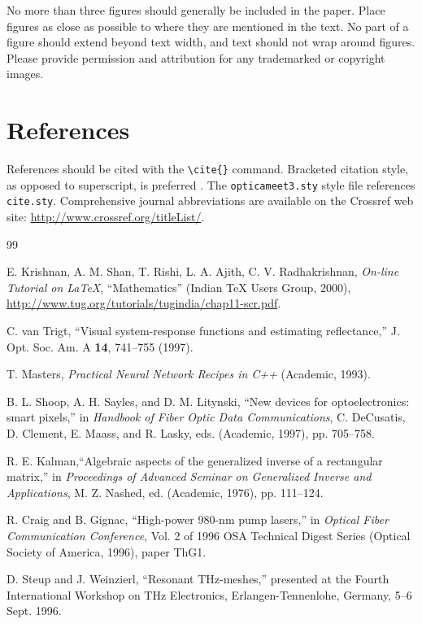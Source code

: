 \documentclass[letterpaper,10pt]{article}
\begin{document}
No more than three figures should generally be included in the paper. Place figures as close as possible to where they
are mentioned in the text. No part of a figure should extend beyond text width, and text should not wrap around figures. Please provide permission and attribution for any trademarked or copyright images.

\section{References}
References should be cited with the \verb+\cite{}+ command.
Bracketed citation style, as opposed to superscript, is preferred
\cite{krishnan00,vantrigt97,masters93,shoop97,kalman76,craig96,steup96}.
The \texttt{opticameet3.sty} style file references \texttt{cite.sty}. Comprehensive journal abbreviations are available on the Crossref web site:
\href{http://www.crossref.org/titleList/}{http://www.crossref.org/titleList/}.

\begin{thebibliography}{99} %



 E. Krishnan, A. M. Shan, T. Rishi, L. A. Ajith, C. V.
Radhakrishnan, \textit{On-line Tutorial on \LaTeX{}},
``Mathematics'' (Indian \TeX{} Users Group, 2000), \\
\url{http://www.tug.org/tutorials/tugindia/chap11-scr.pdf}.

 C. van Trigt, ``Visual system-response functions and estimating reflectance,''
J. Opt. Soc. Am. A \textbf{14}, 741--755 (1997).

 T. Masters, \emph{Practical Neural Network Recipes in C++} (Academic, 1993).

 B. L. Shoop, A. H. Sayles, and D. M. Litynski, ``New devices for optoelectronics: smart pixels,''
in \emph{Handbook of Fiber Optic Data Communications},
C. DeCusatis, D. Clement, E. Maass, and R. Lasky, eds. (Academic, 1997), pp. 705--758.

 R. E. Kalman,``Algebraic aspects of the generalized inverse of a rectangular matrix,'' in
\emph{Proceedings of Advanced Seminar on Generalized Inverse and Applications}, M. Z. Nashed, ed. (Academic, 1976), pp. 111--124.

 R. Craig and B. Gignac, ``High-power 980-nm pump lasers,''
in \emph{Optical Fiber Communication Conference}, Vol. 2 of 1996 OSA Technical Digest Series (Optical Society of America, 1996), paper ThG1.

 D. Steup and J. Weinzierl, ``Resonant THz-meshes,''
presented at the Fourth International Workshop on THz Electronics, Erlangen-Tennenlohe, Germany, 5--6 Sept. 1996.

\end{thebibliography}
\end{document}
